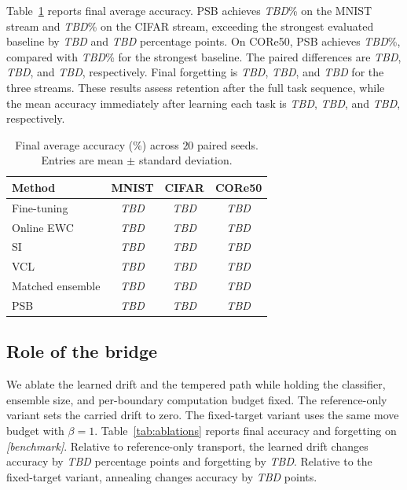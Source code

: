 Table~\ref{tab:main_results} reports final average accuracy. PSB
achieves \textit{TBD}\% on the MNIST stream and \textit{TBD}\% on
the CIFAR stream, exceeding the strongest evaluated baseline by
\textit{TBD} and \textit{TBD} percentage points. On CORe50, PSB
achieves \textit{TBD}\%, compared with \textit{TBD}\% for the
strongest baseline. The paired differences are \textit{TBD},
\textit{TBD}, and \textit{TBD}, respectively. Final forgetting is
\textit{TBD}, \textit{TBD}, and \textit{TBD} for the three streams.
These results assess retention after the full task sequence, while the
mean accuracy immediately after learning each task is \textit{TBD},
\textit{TBD}, and \textit{TBD}, respectively.

\begin{table}[t]
\centering
\caption{Final average accuracy (\%) across $20$ paired seeds. Entries
are mean $\pm$ standard deviation.}
\label{tab:main_results}
\setlength{\tabcolsep}{3.5pt}
\begin{tabular}{lccc}
\hline
Method & MNIST & CIFAR & CORe50 \\
\hline
Fine-tuning & \textit{TBD} & \textit{TBD} & \textit{TBD} \\
Online EWC & \textit{TBD} & \textit{TBD} & \textit{TBD} \\
SI & \textit{TBD} & \textit{TBD} & \textit{TBD} \\
VCL & \textit{TBD} & \textit{TBD} & \textit{TBD} \\
Matched ensemble & \textit{TBD} & \textit{TBD} & \textit{TBD} \\
PSB & \textit{TBD} & \textit{TBD} & \textit{TBD} \\
\hline
\end{tabular}
\end{table}

\subsection{Role of the bridge}

We ablate the learned drift and the tempered path while holding the
classifier, ensemble size, and per-boundary computation budget fixed.
The reference-only variant sets the carried drift to zero. The
fixed-target variant uses the same move budget with $\beta=1$.
Table~\ref{tab:ablations} reports final accuracy and forgetting on
\emph{[benchmark]}. Relative to reference-only transport, the learned
drift changes accuracy by \textit{TBD} percentage points and
forgetting by \textit{TBD}. Relative to the fixed-target variant,
annealing changes accuracy by \textit{TBD} points.

